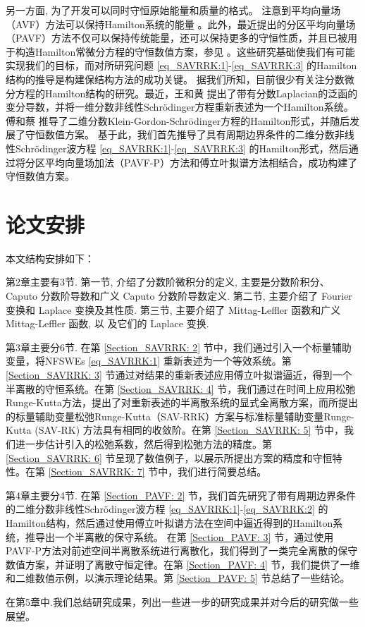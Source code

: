 另一方面, 为了开发可以同时守恒原始能量和质量的格式。
注意到平均向量场（AVF）方法可以保持Hamilton系统的能量 \cite{buddGeometricIntegrationUsing1999,quispelNewClassEnergypreserving2008}。此外，最近提出的分区平均向量场（PAVF）方法不仅可以保持传统能量，还可以保持更多的守恒性质，并且已被用于构造Hamilton常微分方程的守恒数值方案，参见 \cite{caiPartitionedAveragedVector2018}。这些研究基础使我们有可能实现我们的目标，而对所研究问题 \eqref{eq_SAVRRK:1}-\eqref{eq_SAVRRK:3} 的Hamilton结构的推导是构建保结构方法的成功关键。
据我们所知，目前很少有关注分数微分方程的Hamilton结构的研究。最近，王和黄 \cite{wangStructurepreservingNumericalMethods2018} 提出了带有分数Laplacian的泛函的变分导数，并将一维分数非线性Schr{\"o}dinger方程重新表述为一个Hamilton系统。傅和蔡 \cite{fuStructurepreservingAlgorithmsTwodimensional2020} 推导了二维分数Klein-Gordon-Schr{\"o}dinger方程的Hamilton形式，并随后发展了守恒数值方案。
基于此，我们首先推导了具有周期边界条件的二维分数非线性Schr{\"o}dinger波方程 \eqref{eq_SAVRRK:1}-\eqref{eq_SAVRRK:3} 的Hamilton形式，然后通过将分区平均向量场加法（PAVF-P）方法和傅立叶拟谱方法相结合，成功构建了守恒数值方案。

\section{论文安排}
本文结构安排如下：

第2章主要有3节. 第一节, 介绍了分数阶微积分的定义, 主要是分数阶积分、Caputo 分数阶导数和广义 Caputo 分数阶导数定义. 第二节, 主要介绍了 Fourier 变换和 Laplace 变换及其性质. 
第三节, 主要介绍了 Mittag-Leffler 函数和广义 Mittag-Leffler 函数, 以 及它们的 Laplace 变换.

第3章主要分6节. 在第 \ref{Section_SAVRRK: 2} 节中，我们通过引入一个标量辅助变量，将NFSWEs \eqref{eq_SAVRRK:1} 重新表述为一个等效系统。第 \ref{Section_SAVRRK: 3} 节通过对结果的重新表述应用傅立叶拟谱逼近，得到一个半离散的守恒系统。在第 \ref{Section_SAVRRK: 4} 节，我们通过在时间上应用松弛Runge-Kutta方法，提出了对重新表述的半离散系统的显式全离散方案，而所提出的标量辅助变量松弛Runge-Kutta（SAV-RRK）方案与标准标量辅助变量Runge-Kutta (SAV-RK) 方法具有相同的收敛阶。在第 \ref{Section_SAVRRK: 5} 节中，我们进一步估计引入的松弛系数，然后得到松弛方法的精度。第 \ref{Section_SAVRRK: 6} 节呈现了数值例子，以展示所提出方案的精度和守恒特性。在第 \ref{Section_SAVRRK: 7} 节中，我们进行简要总结。


第4章主要分4节. 在第 \ref{Section_PAVF: 2} 节，我们首先研究了带有周期边界条件的二维分数非线性Schr{\"o}dinger波方程 \eqref{eq_SAVRRK:1}-\eqref{eq_SAVRRK:2} 的Hamilton结构，然后通过使用傅立叶拟谱方法在空间中逼近得到的Hamilton系统，推导出一个半离散的保守系统。
在第 \ref{Section_PAVF: 3} 节，通过使用PAVF-P方法对前述空间半离散系统进行离散化，我们得到了一类完全离散的保守数值方案，并证明了离散守恒定律。在第 \ref{Section_PAVF: 4} 节，我们提供了一维和二维数值示例，以演示理论结果。第 \ref{Section_PAVF: 5} 节总结了一些结论。

在第5章中.我们总结研究成果，列出一些进一步的研究成果并对今后的研究做一些展望。